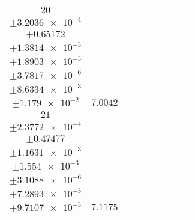 \documentclass[8pt]{article}
\begin{document}
\begin{longtable}[l]{c c c c c c c c c}
$\num{20}$ & \begin{tabular}[c]{@{}c@{}}$\num{2.8493e-2}$ \\ $\pm\num{3.2036e-4}$\end{tabular} & \begin{tabular}[c]{@{}c@{}}$\num{-3.8619e-3}$ \\ $\pm\num{0.65172}$\end{tabular} & \begin{tabular}[c]{@{}c@{}}$\num{0.85541}$ \\ $\pm\num{1.3814e-3}$\end{tabular} & \begin{tabular}[c]{@{}c@{}}$\num{3.6276e+3}$ \\ $\pm\num{1.8903e-3}$\end{tabular} & \begin{tabular}[c]{@{}c@{}}$\num{7.2571}$ \\ $\pm\num{3.7817e-6}$\end{tabular} & \begin{tabular}[c]{@{}c@{}}$\num{0.67974}$ \\ $\pm\num{8.6334e-3}$\end{tabular} & \begin{tabular}[c]{@{}c@{}}$\num{0.71678}$ \\ $\pm\num{1.179e-2}$\end{tabular} & $\num{7.0042}$\\
$\num{21}$ & \begin{tabular}[c]{@{}c@{}}$\num{2.8882e-2}$ \\ $\pm\num{2.3772e-4}$\end{tabular} & \begin{tabular}[c]{@{}c@{}}$\num{0.56554}$ \\ $\pm\num{0.47477}$\end{tabular} & \begin{tabular}[c]{@{}c@{}}$\num{7.0285}$ \\ $\pm\num{1.1631e-3}$\end{tabular} & \begin{tabular}[c]{@{}c@{}}$\num{3.6337e+3}$ \\ $\pm\num{1.554e-3}$\end{tabular} & \begin{tabular}[c]{@{}c@{}}$\num{7.2695}$ \\ $\pm\num{3.1088e-6}$\end{tabular} & \begin{tabular}[c]{@{}c@{}}$\num{0.68954}$ \\ $\pm\num{7.2893e-3}$\end{tabular} & \begin{tabular}[c]{@{}c@{}}$\num{0.64005}$ \\ $\pm\num{9.7107e-3}$\end{tabular} & $\num{7.1175}$\\

\end{longtable}
\end{document}
